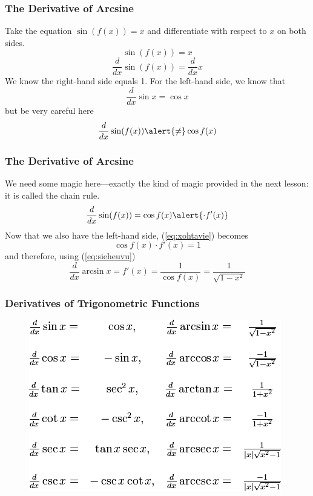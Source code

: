 \documentclass[xcolor=dvipsnames]{beamer}
\begin{document}
\begin{frame}
  \frametitle{The Derivative of Arcsine}
Take the equation $\sin(f(x))=x$ and differentiate with respect to $x$
on both sides.
\begin{equation}
  \label{eq:heipaeng}
  \sin(f(x))=x
\end{equation}
\begin{equation}
  \label{eq:xohtavie}
  \frac{d}{dx}\sin(f(x))=\frac{d}{dx}x
\end{equation}
We know the right-hand side equals 1. For the left-hand side, we know that
\begin{equation}
  \label{eq:keeshoot}
  \frac{d}{dx}\sin{}x=\cos{}x
\end{equation}
but be very careful here
\begin{equation}
  \label{eq:ungitoov}
  \frac{d}{dx}\sin(f(x))\alert{\neq}\cos{}f(x)
\end{equation}
\end{frame}

\begin{frame}
  \frametitle{The Derivative of Arcsine}
  We need some magic here---exactly the kind of magic provided in the
  next lesson: it is called the chain rule.
  \begin{equation}
    \label{eq:eeceiloh}
  \frac{d}{dx}\sin(f(x))=\cos{}f(x)\alert{\cdot{}f'(x)}
  \end{equation}
  Now that we also have the left-hand side, (\ref{eq:xohtavie}) becomes
  \begin{equation}
    \label{eq:ahtiegho}
    \cos{}f(x)\cdot{}f'(x)=1
  \end{equation}
  and therefore, using (\ref{eq:sieheuvu})
  \begin{equation}
    \label{eq:phiquael}
    \frac{d}{dx}\arcsin{}x=f'(x)=\frac{1}{\cos{}f(x)}=\frac{1}{\sqrt{1-x^{2}}}
  \end{equation}
\end{frame}

\begin{frame}
  \frametitle{Derivatives of Trigonometric Functions}
\begin{figure}[h]
\includegraphics[scale=.6]{./diagrams/trigdiff.png}
\end{figure}
\end{frame}
\end{document}
